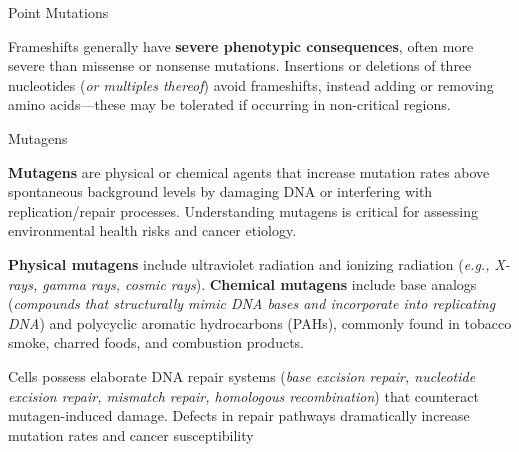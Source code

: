 \documentclass[10pt]{article}
\begin{document}
\begin{core}{Point Mutations}
\begin{enumerate}

        Frameshifts generally have \textbf{severe phenotypic consequences}, often more severe than missense or nonsense mutations. Insertions or deletions of three nucleotides (\textit{or multiples thereof}) avoid frameshifts, instead adding or removing amino acids---these may be tolerated if occurring in non-critical regions.

      \end{enumerate}

    \end{core}

    \begin{core}{Mutagens}

      \textbf{Mutagens} are physical or chemical agents that increase mutation rates above spontaneous background levels by damaging DNA or interfering with replication/repair processes. Understanding mutagens is critical for assessing environmental health risks and cancer etiology.

      \textbf{Physical mutagens} include ultraviolet radiation and ionizing radiation (\textit{e.g., X-rays, gamma rays, cosmic rays}). \textbf{Chemical mutagens} include base analogs (\textit{compounds that structurally mimic DNA bases and incorporate into replicating DNA}) and polycyclic aromatic hydrocarbons (PAHs), commonly found in tobacco smoke, charred foods, and combustion products.

      Cells possess elaborate DNA repair systems (\textit{base excision repair, nucleotide excision repair, mismatch repair, homologous recombination}) that counteract mutagen-induced damage. Defects in repair pathways dramatically increase mutation rates and cancer susceptibility

    \end{core}
\end{document}
